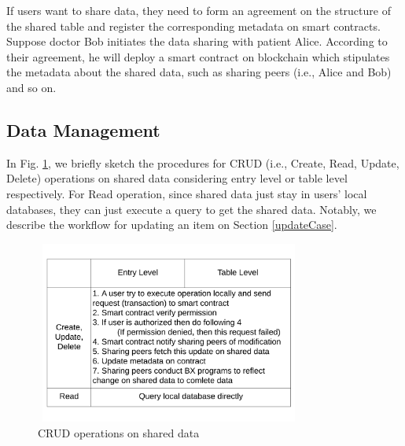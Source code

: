 \documentclass[conference]{IEEEtran}
\begin{document}
If users want to share data, they need to form an agreement on the structure of the shared table and register the corresponding metadata on smart contracts. Suppose doctor Bob initiates the data sharing with patient Alice. According to their agreement, he will deploy a smart contract on blockchain which stipulates the metadata about the shared data, such as sharing peers (i.e., Alice and Bob) and so on. 


%

\subsection{Data Management}
\label{dataManage}

In Fig. \ref{data manage}, we briefly sketch the procedures for CRUD  (i.e., Create, Read, Update, Delete) operations on shared data considering entry level or table level respectively. For Read operation, since shared data just stay in users' local databases, they can just execute a query to get the shared data. Notably, we describe the workflow for updating an item on Section \ref{updateCase}.

\begin{figure}[htbp]
    \centerline{\includegraphics[width=250pt,height=170pt]{dataManage.pdf}}
    \caption{CRUD operations on shared data}
    \label{data manage}
\end{figure}
\end{document}
